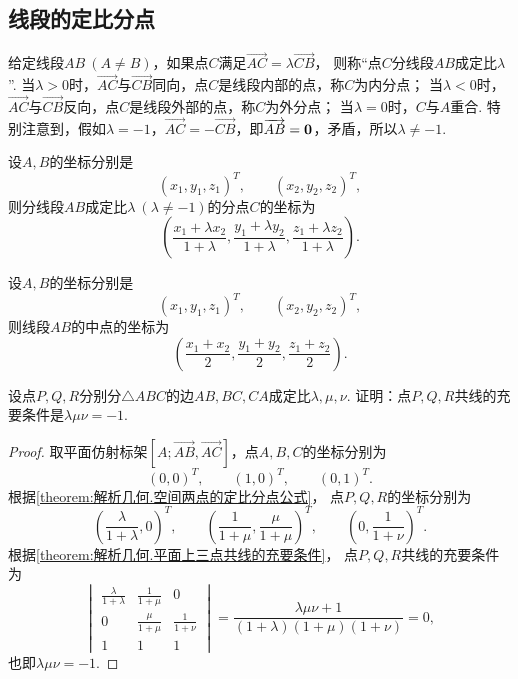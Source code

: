 \subsection{线段的定比分点}
给定线段\(AB\ (A \neq B)\)，如果点\(C\)满足\(\vec{AC} = \lambda \vec{CB}\)，
则称“点\(C\)分线段\(AB\)成定比\(\lambda\)”.
当\(\lambda>0\)时，\(\vec{AC}\)与\(\vec{CB}\)同向，点\(C\)是线段内部的点，称\(C\)为内分点；
当\(\lambda<0\)时，\(\vec{AC}\)与\(\vec{CB}\)反向，点\(C\)是线段外部的点，称\(C\)为外分点；
当\(\lambda=0\)时，\(C\)与\(A\)重合.
特别注意到，假如\(\lambda=-1\)，\(\vec{AC}=-\vec{CB}\)，即\(\overrightarrow{AB}=\boldsymbol{0}\)，矛盾，所以\(\lambda\neq-1\).

\begin{theorem}\label{theorem:解析几何.空间两点的定比分点公式}
设\(A,B\)的坐标分别是\[
	(x_1,y_1,z_1)^T, \qquad
	(x_2,y_2,z_2)^T,
\]
则分线段\(AB\)成定比\(\lambda\ (\lambda\neq-1)\)的分点\(C\)的坐标为
\begin{equation}
	\left(
		\frac{x_1 + \lambda x_2}{1+\lambda},
		\frac{y_1 + \lambda y_2}{1+\lambda},
		\frac{z_1 + \lambda z_2}{1+\lambda}
	\right).
\end{equation}
\end{theorem}

\begin{corollary}
设\(A,B\)的坐标分别是\[
	(x_1,y_1,z_1)^T, \qquad
	(x_2,y_2,z_2)^T,
\]
则线段\(AB\)的中点的坐标为
\begin{equation}
	\left(
		\frac{x_1 + x_2}{2},
		\frac{y_1 + y_2}{2},
		\frac{z_1 + z_2}{2}
	\right).
\end{equation}
\end{corollary}

\begin{example}[门内劳斯定理]
设点\(P,Q,R\)分别分\(\triangle ABC\)的边\(AB,BC,CA\)成定比\(\lambda,\mu,\nu\).
证明：点\(P,Q,R\)共线的充要条件是\(\lambda \mu \nu = -1\).
\begin{proof}
取平面仿射标架\([A;\vec{AB},\vec{AC}]\)，点\(A,B,C\)的坐标分别为\[
	(0,0)^T, \qquad
	(1,0)^T, \qquad
	(0,1)^T.
\]
根据\cref{theorem:解析几何.空间两点的定比分点公式}，
点\(P,Q,R\)的坐标分别为\[
	\left(\frac{\lambda}{1+\lambda},0\right)^T, \qquad
	\left(\frac{1}{1+\mu},\frac{\mu}{1+\mu}\right)^T, \qquad
	\left(0,\frac{1}{1+\nu}\right)^T.
\]
根据\cref{theorem:解析几何.平面上三点共线的充要条件}，
点\(P,Q,R\)共线的充要条件为\[
	\begin{vmatrix}
		\frac{\lambda}{1+\lambda} & \frac{1}{1+\mu} & 0 \\
		0 & \frac{\mu}{1+\mu} & \frac{1}{1+\nu} \\
		1 & 1 & 1
	\end{vmatrix}
	= \frac{\lambda \mu \nu + 1}{(1+\lambda)(1+\mu)(1+\nu)}
	= 0,
\]也即\(\lambda \mu \nu = -1\).
\end{proof}
\end{example}

